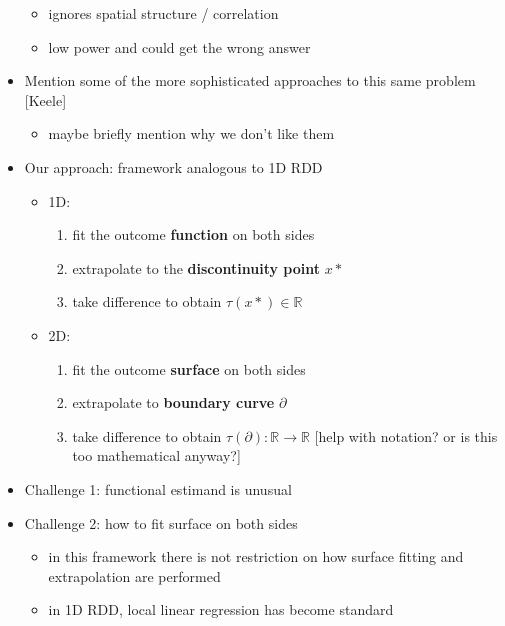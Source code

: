 \documentclass[letter]{article}
\providecommand{\tightlist}{%
      \setlength{\itemsep}{0pt}\setlength{\parskip}{0pt}}
\newcommand{\boundary}{\partial}
\providecommand{\tightlist}{%
  	  \setlength{\itemsep}{0pt}\setlength{\parskip}{0pt}}
\begin{document}
\begin{itemize}
  \begin{itemize}
  \tightlist
  \item
    ignores spatial structure / correlation
  \item
    low power and could get the wrong answer
  \end{itemize}
\item
  Mention some of the more sophisticated approaches to this same problem {[}Keele{]}

  \begin{itemize}
  \tightlist
  \item
    maybe briefly mention why we don't like them
  \end{itemize}
\item
  Our approach: framework analogous to 1D RDD

  \begin{itemize}
  \tightlist
  \item
    1D:

    \begin{enumerate}
    \def\labelenumi{\arabic{enumi}.}
    \tightlist
    \item
      fit the outcome \textbf{function} on both sides
    \item
      extrapolate to the \textbf{discontinuity point} \(x*\)
    \item
      take difference to obtain \(\tau(x*) \in \mathbb{R}\)
    \end{enumerate}
  \item
    2D:

    \begin{enumerate}
    \def\labelenumi{\arabic{enumi}.}
    \tightlist
    \item
      fit the outcome \textbf{surface} on both sides
    \item
      extrapolate to \textbf{boundary curve} \(\boundary\)
    \item
      take difference to obtain \(\tau(\boundary): \mathbb{R} \rightarrow \mathbb{R}\) {[}help with notation? or is this too mathematical anyway?{]}
    \end{enumerate}
  \end{itemize}
\item
  Challenge 1: functional estimand is unusual
\item
  Challenge 2: how to fit surface on both sides

  \begin{itemize}
  \tightlist
  \item
    in this framework there is not restriction on how surface fitting and extrapolation are performed
  \item
    in 1D RDD, local linear regression has become standard


\end{itemize}
\end{itemize}
\end{document}
